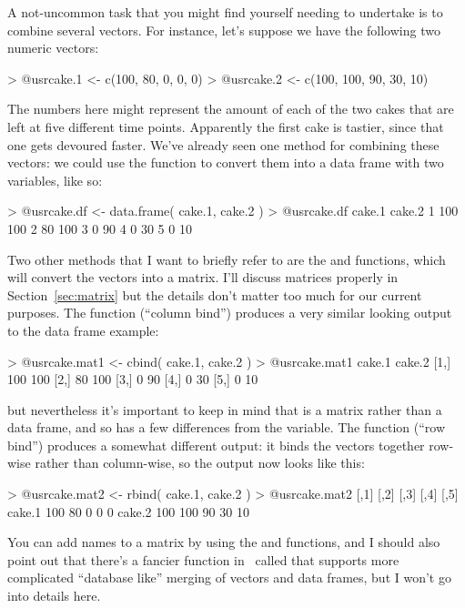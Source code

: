 

A not-uncommon task that you might find yourself needing to undertake is to combine several vectors. For instance, let's suppose we have the following two numeric vectors:
\begin{rblock1}
> @usr{cake.1 <- c(100, 80, 0, 0, 0)}
> @usr{cake.2 <- c(100, 100, 90, 30, 10)}
\end{rblock1}
The numbers here might represent the amount of each of the two cakes that are left at five different time points. Apparently the first cake is tastier, since that one gets devoured faster. We've already seen one method for combining these vectors: we could use the  function to convert them into a data frame with two variables, like so:
\begin{rblock1}
> @usr{cake.df <- data.frame( cake.1, cake.2 )}
> @usr{cake.df}
  cake.1 cake.2
1    100    100
2     80    100
3      0     90
4      0     30
5      0     10
\end{rblock1}
Two other methods that I want to briefly refer to are the  and  functions, which will convert the vectors into a matrix. I'll discuss matrices properly in Section~\ref{sec:matrix} but the details don't matter too much for our current purposes. The  function (``column bind'') produces a very similar looking output to the data frame example:
\begin{rblock1}
> @usr{cake.mat1 <- cbind( cake.1, cake.2 )}
> @usr{cake.mat1}
     cake.1 cake.2
[1,]    100    100
[2,]     80    100
[3,]      0     90
[4,]      0     30
[5,]      0     10
\end{rblock1}
but nevertheless it's important to keep in mind that  is a matrix rather than a data frame, and so has a few differences from the  variable. The  function (``row bind'') produces a somewhat different output: it binds the vectors together row-wise rather than column-wise, so the output now looks like this:
\begin{rblock1}
> @usr{cake.mat2 <- rbind( cake.1, cake.2 )}
> @usr{cake.mat2}
       [,1] [,2] [,3] [,4] [,5]
cake.1  100   80    0    0    0
cake.2  100  100   90   30   10
\end{rblock1}
You can add names to a matrix by using the  and  functions, and I should also point out that there's a fancier function in \R\ called  that supports more complicated ``database like'' merging of vectors and data frames, but I won't go into details here.

